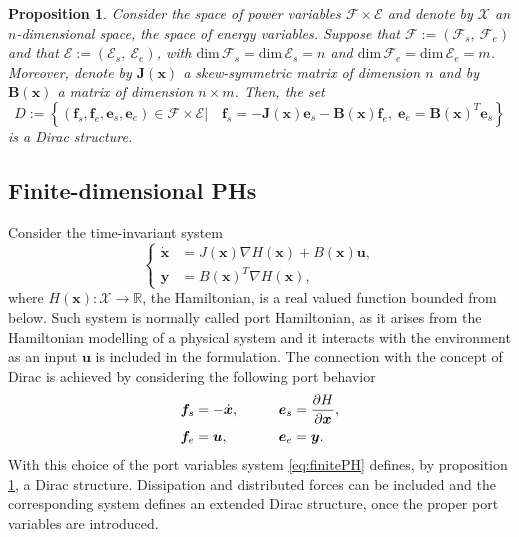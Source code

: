 \documentclass[preprint,12pt]{elsarticle}
\newtheorem{proposition}{Proposition}
\begin{document}
{\begin{proposition}
	\label{prop:Dirac}
Consider the space of power variables $\mathcal{F} \times \mathcal{E}$ and denote by $\mathcal{X}$ an $n$-dimensional space, the space of energy variables. Suppose that $\mathcal{F} := (\mathcal{F}_s, \ \mathcal{F}_e )$ and that $\mathcal{E} := (\mathcal{E}_s,  \ \mathcal{E}_e )$, with $\text{dim} \, \mathcal{F}_s = \text{dim} \, \mathcal{E}_s = n$ and $\text{dim} \, \mathcal{F}_e = \text{dim} \, \mathcal{E}_e = m$. Moreover, denote
	by $\bm{J}(\bm{x})$ a skew-symmetric matrix of dimension $n$ and by $\bm{B}(\bm{x})$ a matrix of dimension $n \times m$. Then, the set
	\begin{equation}
	D := \left\{ (\bm{f}_s, \bm{f}_e , \bm{e}_s ,\bm{e}_e ) \in \mathcal{F} \times \mathcal{E} \vert \quad \bm{f}_s = - \bm{J}(\bm{x}) \bm{e}_s - \bm{B}(\bm{x}) \bm{f}_e, \; \bm{e}_e = \bm{B}(\bm{x})^T \bm{e}_s \right\}
\end{equation}
is a Dirac structure.
\end{proposition}
\subsection{Finite-dimensional PHs}
Consider the time-invariant system
\begin{equation}
\label{eq:finitePH}
\begin{cases}
\dot{ \bm{x} } &= J(\bm{x}) \nabla H(\bm{x}) + B(\bm{x})\bm{u}, \\
\bm{y} &= B(\bm{x})^T \nabla H(\bm{x}),
\end{cases}
\end{equation}
where $ H(\bm{x}) : \mathcal{X} \rightarrow \mathbb{R} $, the Hamiltonian, is a real valued function bounded from below. Such system is normally called port Hamiltonian, as it arises from the Hamiltonian modelling of a physical system and it interacts with the environment as an input $\bm{u}$ is included in the formulation. The connection with the concept of Dirac is achieved by considering the following port behavior
\begin{equation}
\begin{aligned}
\bm{f}_s &= - \dot{ \bm{x} }, \qquad 
&\bm{e}_s &= \diffp{H}{\bm{x}}, \\
\bm{f}_e &= \bm{u}, \qquad
&\bm{e}_e &= \bm{y}. \\
\end{aligned}
\end{equation}
With this choice of the port variables system \ref{eq:finitePH} defines, by proposition \ref{prop:Dirac}, a Dirac structure. Dissipation and distributed forces can be included and the corresponding system defines an extended Dirac structure, once the proper port variables are introduced.
}
\end{document}
